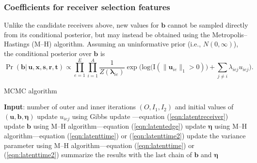 \documentclass[ba]{imsart}
\def\spacingset#1{\renewcommand{\baselinestretch}%
	{#1}\small\normalsize} \spacingset{1}
\numberwithin{equation}{section}
\theoremstyle{plain}
\begin{document}
	\subsubsection{Coefficients for receiver selection features}
	Unlike the candidate receivers above, new values for $\boldsymbol{b}$ cannot be sampled directly from its conditional posterior, but may instead be obtained using the Metropolis--Hastings (M--H) algorithm. Assuming an uninformative prior (i.e., $N({0},\infty)$), the conditional posterior over $\boldsymbol{b}$ is
	\begin{equation}
		\Pr(\boldsymbol{b}| \,\boldsymbol{u}, \boldsymbol{x}, \boldsymbol{s}, \boldsymbol{r},\boldsymbol{t})\propto \prod_{e=1}^E
		\prod_{i=1}^A \frac{1}{Z(\boldsymbol{\lambda}_{ie})}\exp\Big(\mbox{log}\big(\text{I}( \lVert \boldsymbol{u}_{ie}\rVert_1 > 0)\big) + \sum\limits_{j \neq i} \lambda_{iej}u_{iej}\Big).
		\label{eqn:latentedge}
	\end{equation}
	\begin{algorithm}[!t]
		\spacingset{1}
		\SetAlgoLined
		\caption{MCMC algorithm}
		\begin{algorithmic}
			\STATE \textbf{Input}: number of outer and inner iterations $(O, I_1, I_2)$ and initial values of $(\boldsymbol{u}, \boldsymbol{b}, \boldsymbol{\eta})$
			\vskip 0.1in
			\STATE update $u_{iej}$ using Gibbs update ---equation (\ref{eqn:latentreceiver})
			\ENDFOR
			\ENDFOR
			\ENDFOR
			\STATE update $\boldsymbol{b}$ using M--H algorithm---equation (\ref{eqn:latentedge})
			\ENDFOR
			\STATE update $\boldsymbol{\eta}$ using M--H algorithm---equation (\ref{eqn:latenttime}) or (\ref{eqn:latenttime2}) 
			\ENDFOR
			\STATE update the variance parameter using M--H algorithm---equation (\ref{eqn:latenttime}) or (\ref{eqn:latenttime2}) 
			\ENDIF
			\ENDFOR
			\STATE	summarize the results with the last chain of $\boldsymbol{b}$ and $\boldsymbol{\eta}$
		\end{algorithmic}
		\label{alg:MCMC}
	\end{algorithm}
\end{document}
